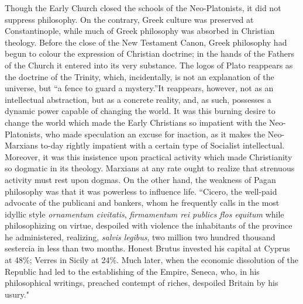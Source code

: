 \documentclass{book}
\begin{document}
Though the Early Church closed the schools of the Neo-Platonists, it did not suppress philosophy. On the contrary, Greek culture was preserved at Constantinople, while much of Greek philosophy was absorbed in Christian theology. Before the close of the New Testament Canon, Greek philosophy had begun to colour the expression of Christian doctrine; in the hands of the Fathers of the Church it entered into its very substance. The logos of Plato reappears as the doctrine of the Trinity, which, incidentally, is not an explanation of the universe, but “a fence to guard a mystery.”\footnotemark[2] It reappears, however, not as an intellectual abstraction, but as a concrete reality, and, as such, possesses a dynamic power capable of changing the world. It was this burning desire to change the world which made the Early Christians so impatient with the Neo-Platonists, who made speculation an excuse for inaction, as it makes the Neo-Marxians to-day rightly impatient with a certain type of Socialist intellectual. Moreover, it was this insistence upon practical activity which made Christianity so dogmatic in its theology. Marxians at any rate ought to realize that strenuous activity must rest upon dogmas. On the other hand, the weakness of Pagan philosophy was that it was powerless to influence life. “Cicero, the well-paid advocate of the publicani and bankers, whom he frequently calls in the most idyllic style \emph{ornamentum civitatis}, \emph{firmamentum rei publics flos equitum} while philosophizing on virtue, despoiled with violence the inhabitants of the province he administered, realizing, \emph{salvis legibus}, two million two hundred thousand sestercia in less than two months. Honest Brutus invested his capital at Cyprus at 48\%; Verres in Sicily at 24\%. Much later, when the economic dissolution of the Republic had led to the establishing of the Empire, Seneca, who, in his philosophical writings, preached contempt of riches, despoiled Britain by his usury."\footnotemark[3]
\end{document}
